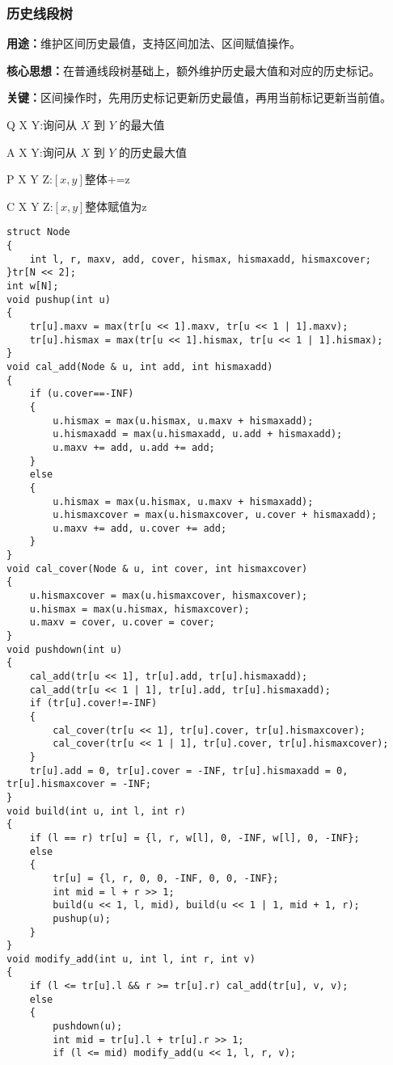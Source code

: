 \documentclass[a4paper,fontset=none]{ctexart}
\begin{document}
\subsubsection{历史线段树}
\textbf{用途：}维护区间历史最值，支持区间加法、区间赋值操作。

\textbf{核心思想：}在普通线段树基础上，额外维护历史最大值和对应的历史标记。

\textbf{关键：}区间操作时，先用历史标记更新历史最值，再用当前标记更新当前值。

Q X Y:询问从 $X$ 到 $Y$ 的最大值

A X Y:询问从 $X$ 到 $Y$ 的历史最大值

P X Y Z:$[x,y]$整体+=z

C X Y Z:$[x,y]$整体赋值为z

\begin{verbatim}
struct Node
{
    int l, r, maxv, add, cover, hismax, hismaxadd, hismaxcover;
}tr[N << 2];
int w[N];
void pushup(int u)
{
    tr[u].maxv = max(tr[u << 1].maxv, tr[u << 1 | 1].maxv);
    tr[u].hismax = max(tr[u << 1].hismax, tr[u << 1 | 1].hismax);
}
void cal_add(Node & u, int add, int hismaxadd)
{
    if (u.cover==-INF)
    {
        u.hismax = max(u.hismax, u.maxv + hismaxadd);
        u.hismaxadd = max(u.hismaxadd, u.add + hismaxadd);
        u.maxv += add, u.add += add;
    }
    else
    {
        u.hismax = max(u.hismax, u.maxv + hismaxadd);
        u.hismaxcover = max(u.hismaxcover, u.cover + hismaxadd);
        u.maxv += add, u.cover += add;
    }
}
void cal_cover(Node & u, int cover, int hismaxcover)
{
    u.hismaxcover = max(u.hismaxcover, hismaxcover);
    u.hismax = max(u.hismax, hismaxcover);
    u.maxv = cover, u.cover = cover;
}
void pushdown(int u)
{
    cal_add(tr[u << 1], tr[u].add, tr[u].hismaxadd);
    cal_add(tr[u << 1 | 1], tr[u].add, tr[u].hismaxadd);
    if (tr[u].cover!=-INF)
    {
        cal_cover(tr[u << 1], tr[u].cover, tr[u].hismaxcover);
        cal_cover(tr[u << 1 | 1], tr[u].cover, tr[u].hismaxcover);
    }
    tr[u].add = 0, tr[u].cover = -INF, tr[u].hismaxadd = 0, tr[u].hismaxcover = -INF;
}
void build(int u, int l, int r)
{
    if (l == r) tr[u] = {l, r, w[l], 0, -INF, w[l], 0, -INF};
    else
    {
        tr[u] = {l, r, 0, 0, -INF, 0, 0, -INF};
        int mid = l + r >> 1;
        build(u << 1, l, mid), build(u << 1 | 1, mid + 1, r);
        pushup(u);
    }
}
void modify_add(int u, int l, int r, int v)
{
    if (l <= tr[u].l && r >= tr[u].r) cal_add(tr[u], v, v);
    else
    {
        pushdown(u);
        int mid = tr[u].l + tr[u].r >> 1;
        if (l <= mid) modify_add(u << 1, l, r, v);

\end{verbatim}
\end{document}

